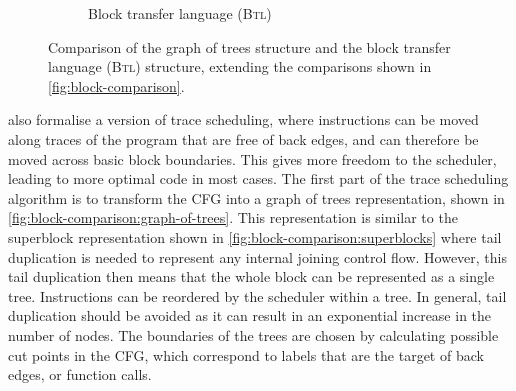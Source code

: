 \begin{figure}
\begin{subfigure}[b]{0.48\linewidth}
    \caption{Block transfer language (\textsc{Btl})}\label{fig:block-comparison:btl}
  \end{subfigure}
  \caption[Comparison of the graph of trees structure and
  \textsc{Btl}.]{Comparison of the graph of trees structure and the block
    transfer language (\textsc{Btl}) structure, extending the comparisons shown
    in \cref{fig:block-comparison}.}%
  \label{fig:block-comparison-second}
\end{figure}

\textcite{tristan08_formal_verif_trans_valid} also formalise a version of trace
scheduling, where instructions can be moved along traces of the program that are
free of back edges, and can therefore be moved across basic block boundaries.
This gives more freedom to the scheduler, leading to more optimal code in most
cases.  The first part of the trace scheduling algorithm is to transform the
\gls{CFG} into a graph of trees representation, shown in
\cref{fig:block-comparison:graph-of-trees}.  This representation is similar to
the superblock representation shown in \cref{fig:block-comparison:superblocks}
where tail duplication is needed to represent any internal joining control flow.
However, this tail duplication then means that the whole block can be
represented as a single tree.  Instructions can be reordered by the scheduler
within a tree.  In general, tail duplication should be avoided as it can result
in an exponential increase in the number of nodes.  The boundaries of the trees
are chosen by calculating possible cut points in the \gls{CFG}, which correspond
to labels that are the target of back edges, or function calls.


